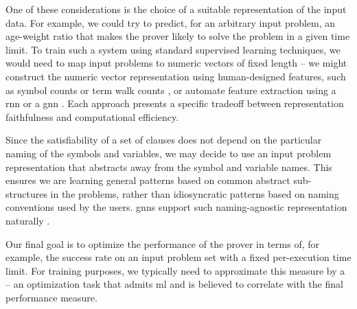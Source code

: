 
One of these considerations is the choice of a suitable representation of the input data.
For example, we could try to predict, for an arbitrary input problem, an age-weight ratio
that makes the prover likely to solve the problem in a given time limit.
To train such a system using standard supervised learning techniques,
we would need to map input problems to numeric vectors of fixed length --
we might construct the numeric vector representation using human-designed features,
such as symbol counts or term walk counts \cite{DBLP:conf/mkm/JakubuvU17},
or automate feature extraction using a \gls{rnn} \cite{DBLP:conf/cade/ChvalovskyJ0U19,DBLP:conf/iclr/EvansSAKG18} or a \gls{gnn} \cite{DBLP:conf/cade/JakubuvCOP0U20,DBLP:journals/pami/AbdelazizCMACIK23}.
Each approach presents a specific tradeoff between representation faithfulness and computational efficiency.

Since the satisfiability of a set of clauses does not depend on the particular naming of the symbols and variables,
we may decide to use an input problem representation that abstracts away from the symbol and variable names.
This ensures we are learning general patterns based on common abstract sub-structures in the problems,
rather than idiosyncratic patterns based on naming conventions used by the users.
\Glspl{gnn} support such naming-agnostic representation naturally \cite{DBLP:conf/cade/JakubuvCOP0U20}.

Our final goal is to optimize the performance of the prover in terms of, for example, the success rate on an input problem set with a fixed per-execution time limit.
For training purposes,
we typically need to approximate this measure by a  -- an optimization task that admits \gls{ml} and is believed to correlate with the final performance measure.

